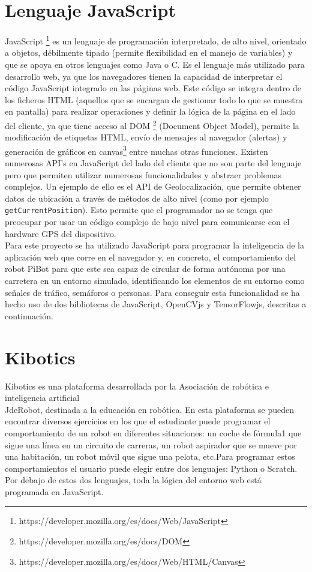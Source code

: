 \documentclass{report}
\begin{document}
\section{Lenguaje JavaScript}
JavaScript \footnote{https://developer.mozilla.org/es/docs/Web/JavaScript} \cite{JavaScript} es un lenguaje de programación interpretado,  de alto nivel, orientado a objetos, débilmente tipado (permite flexibilidad en el manejo de variables) y que se apoya en otros lenguajes como Java o C. Es el lenguaje más utilizado para desarrollo web, ya que los navegadores tienen la capacidad de interpretar el código JavaScript integrado en las páginas web. Este código se integra dentro de los ficheros HTML (aquellos que se encargan de gestionar todo lo que se muestra en pantalla) para realizar operaciones y definir la lógica de la página en el lado del cliente, ya que tiene acceso al DOM \footnote{https://developer.mozilla.org/es/docs/DOM} (Document Object Model),  permite la modificación de etiquetas HTML, envío de mensajes al navegador (alertas) y generación de gráficos en canvas\footnote{https://developer.mozilla.org/es/docs/Web/HTML/Canvas} entre  muchas otras funciones. Existen numerosas API's en JavaScript del lado del cliente que no son parte del lenguaje pero que permiten utilizar numerosas funcionalidades y abstraer problemas complejos. Un ejemplo de ello es el API de Geolocalización, que permite obtener datos de ubicación a través de métodos de alto nivel (como por ejemplo \texttt{getCurrentPosition}). Esto permite que el programador no se tenga que preocupar por usar un código complejo de bajo nivel para comunicarse con el hardware GPS del dispositivo. 
\\

Para este proyecto se ha utilizado JavaScript para programar la inteligencia de la aplicación web que corre en el navegador y, en concreto, el comportamiento del robot PiBot para que este sea capaz de circular de forma autónoma por una carretera en un entorno simulado, identificando los elementos de su entorno como señales de tráfico, semáforos o personas. Para conseguir esta funcionalidad se ha hecho uso de dos bibliotecas de JavaScript, OpenCVjs y TensorFlowjs, descritas a continuación.

\section{Kibotics}
Kibotics \cite{Kibotics} es una plataforma desarrollada por la Asociación de robótica e inteligencia artificial \\JdeRobot, destinada a la educación en robótica. En esta plataforma se pueden encontrar diversos ejercicios en los que el estudiante puede programar el comportamiento de un robot en diferentes situaciones: un coche de fórmula1 que sigue una línea en un circuito de carreras, un robot aspirador que se mueve por una habitación, un robot móvil que sigue una pelota, etc.Para programar estos comportamientos el usuario puede elegir entre dos lenguajes: Python o Scratch. Por debajo de estos dos lenguajes, toda la lógica del entorno web está programada en JavaScript.
\\
\end{document}
